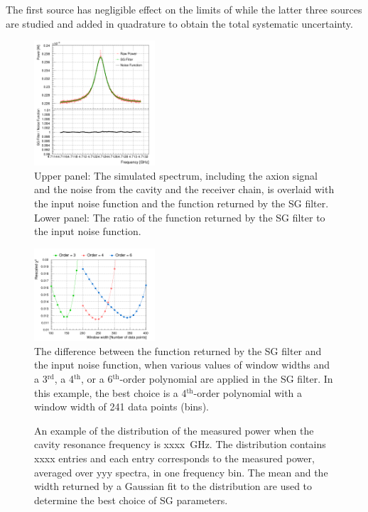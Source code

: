 The first source has negligible effect on the limits of \gagg while the 
latter three sources are studied and added in quadrature to obtain the total 
systematic uncertainty. 

\begin{figure} [htbp]
  \centering
  \includegraphics[width=0.4\textwidth,height = 0.35\textwidth]{figures/GeneratedSpectrum_Optimized_SGFilter_NPar_3_Window_141.png}
  \caption{Upper panel: 
 The simulated spectrum, including the axion signal and 
 the noise from the cavity and the receiver chain, 
 is overlaid with the input noise function and the function returned by 
 the SG filter. Lower panel: The ratio of the function returned by the SG 
 filter to the input noise function.}
  \label{fig:sgcompare}
\end{figure}


\begin{figure} [htbp]
  \centering
  \includegraphics[width=0.4\textwidth,height = 0.25\textwidth]{figures/chi2_Different_Order_Window_SGFilter.png}
  \caption{The difference between the function returned by the SG filter 
  and the input noise function, when various values of window widths and 
  a 3$^\text{rd}$, a 4$^\text{th}$, or a 
  6$^\text{th}$-order polynomial are applied in the SG filter. In this 
  example, the best choice is a 4$^\text{th}$-order polynomial with 
  a window width of 241 data points (bins). }
  \label{fig:sgoptimize}
\end{figure}
 


\begin{figure} [htbp]
  \centering
  \caption{An example of the distribution of the measured power when 
the cavity resonance frequency is xxxx~GHz. The distribution contains 
xxxx entries and each entry corresponds to the measured power, averaged
over yyy spectra, in one frequency bin. The mean and the width returned by 
a Gaussian fit to the distribution are used to determine the best choice of 
SG parameters.}
  \label{fig:noisegauss}
\end{figure}
 

